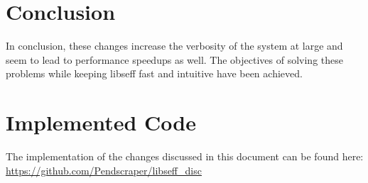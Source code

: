 \documentclass[logo,bsc,singlespacing,parskip,online]{infthesis}
\begin{document}
\chapter{Conclusion}


In conclusion, these changes increase the verbosity of the system at large and seem to lead to performance speedups as well. The objectives of solving these problems while keeping libseff fast and intuitive have been achieved.

% 



\nocite{*}


\appendix

\chapter{Implemented Code}

The implementation of the changes discussed in this document can be found here: 
\url{https://github.com/Pendscraper/libseff_disc}
\end{document}
